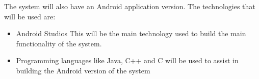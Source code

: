 \documentclass[hidelinks,a4paper,12pt]{article}
\begin{document}
	\begin{flushleft}
		The system will also have an Android application version. The technologies that will be used are:
	\end{flushleft}
	\begin{itemize} 
		\item Android Studios
		\newline
		This will be the main technology used to build the main functionality of the system.
		
		\item Programming languages like Java, C++ and C will be used to assist in building the Android version of the system  
	\end{itemize}		 

 



 
\end{document}
